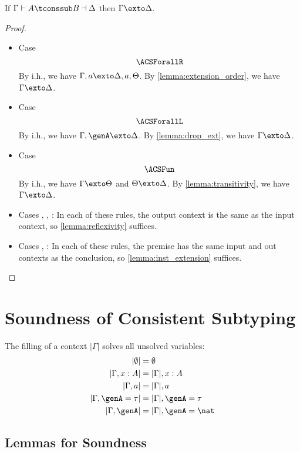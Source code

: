 \begin{mlemma}
  If $\Gamma \vdash A \tconssub B \dashv \Delta$ then $\Gamma \exto \Delta$.
  \label{lemma:sub_extension}
\end{mlemma}
\begin{proof}
  \begin{itemize}
  \item Case \[\ACSForallR\] By i.h., we have $\Gamma, a \exto \Delta, a,
    \Theta$. By \cref{lemma:extension_order}, we have $\Gamma \exto \Delta$.
  \item Case \[\ACSForallL\] By i.h., we have $\Gamma, \genA \exto \Delta$. By
    \cref{lemma:drop_ext}, we have $\Gamma \exto \Delta$.
  \item Case \[\ACSFun\] By i.h., we have $\Gamma \exto \Theta$ and $\Theta
    \exto \Delta$. By \cref{lemma:transitivity}, we have $\Gamma \exto \Delta$.
  \item Cases , , : In each of
    these rules, the output context is the same as the input context, so
    \cref{lemma:reflexivity} suffices.
  \item Cases , : In each of these
    rules, the premise has the same input and out contexts as the conclusion, so
    \cref{lemma:inst_extension} suffices.
  \end{itemize}
\end{proof}

\section{Soundness of Consistent Subtyping}
\label{sec:pf:sound:sub}

\begin{definition}[Filling] The filling of a context $|\Gamma|$ solves all
  unsolved variables:
  \begin{align*}
    |\emptyset| &= \emptyset \\
    |\Gamma, x : A| &= |\Gamma| , x : A \\
    |\Gamma, a| &= |\Gamma| , a \\
    |\Gamma, \genA = \tau| &= |\Gamma| , \genA = \tau \\
    |\Gamma, \genA| &= |\Gamma| , \genA = \nat
  \end{align*}
  \label{def:filling}
\end{definition}


\subsection{Lemmas for Soundness}


